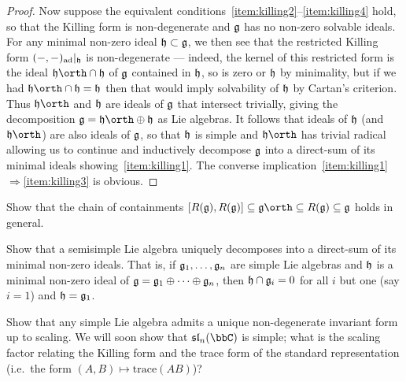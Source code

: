 \begin{theorem}
\begin{proof}
        Now suppose the equivalent conditions~\ref{item:killing2}--\ref{item:killing4} hold, so that the Killing form is
        non-degenerate and $\mathfrak{g}$ has no non-zero solvable ideals. For any
        minimal non-zero ideal $\mathfrak{h}\subset \mathfrak{g}$, we then see that
        the restricted Killing form $(-,-)_{\textnormal{ad}}|_{\mathfrak{h}}$ is non-degenerate ---
        indeed, the kernel of this restricted form is the ideal $\frakh \orth
        \cap \frakh$ of $\mathfrak{g}$
        contained in $\mathfrak{h}$, so is zero or $\mathfrak{h}$ by minimality, but if we had
        $\frakh\orth\cap \frakh = \frakh$ then that would imply solvability of
        $\mathfrak{h}$ by Cartan's criterion. Thus $\frakh\orth$ and $\mathfrak{h}$ are
        ideals of $\mathfrak{g}$ that intersect trivially, giving the decomposition
        $\frakg=\frakh\orth \oplus \frakh$ as Lie algebras. It follows that
        ideals of $\mathfrak{h}$ (and $\frakh\orth$) are also ideals of $\mathfrak{g}$, so
        that $\mathfrak{h}$ is simple and $\frakh\orth$ has trivial radical allowing
        us to continue and inductively decompose $\mathfrak{g}$ into a direct-sum of
        its minimal ideals showing~\ref{item:killing1}. The converse implication~\ref{item:killing1}$\Rightarrow$\ref{item:killing3} is obvious.
    \end{proof}
\end{theorem}

\begin{exercise}
    Show that the chain of containments $[R(\frakg),R(\frakg)]\subseteq
    \frakg\orth\subseteq R(\frakg)\subseteq \frakg$ holds in general.
\end{exercise}

\begin{exercise}
    Show that a semisimple Lie algebra uniquely decomposes into a direct-sum of its
    minimal non-zero ideals. That is, if $\mathfrak{g}_1,\ldots,\mathfrak{g}_n$ are simple
    Lie algebras and $\mathfrak{h}$ is a minimal non-zero ideal of
    $\mathfrak{g}=\mathfrak{g}_1\oplus\cdots \oplus\mathfrak{g}_n$, then $\mathfrak{h}\cap \mathfrak{g}_i=0$
    for all $i$ but one (say $i=1$) and $\mathfrak{h}=\mathfrak{g}_1$.
\end{exercise}

\begin{exercise}
    Show that any simple Lie algebra admits a unique non-degenerate
    invariant form up to scaling. We will soon show that $\sl_n(\bbC)$ is
    simple; what is the scaling factor relating the Killing form and
    the trace form of the standard representation (i.e.\ the form
    $(A,B)\mapsto \text{trace}(AB)$)?
\end{exercise}

